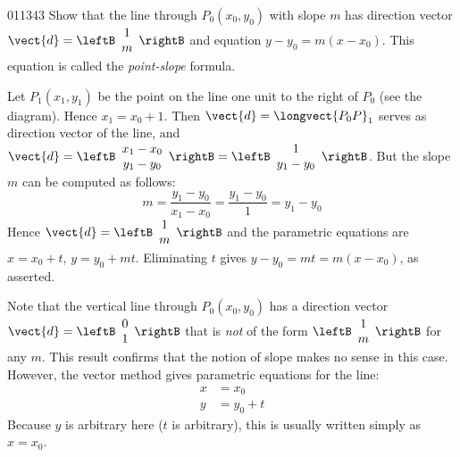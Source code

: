 \begin{example}{}{011343}
Show that the line through $P_{0}(x_{0}, y_{0})$ with slope $m$ has direction vector 
$\vect{d} = \leftB
\begin{array}{c}
1 \\
m
\end{array}
\rightB$
and equation $y - y_{0} = m(x - x_{0})$. This equation is called the \textit{point-slope} formula.



\begin{wrapfigure}[9]{l}{5cm} 
	
\end{wrapfigure}
\setlength{\rightskip}{0pt plus 200pt} 
\begin{solution}  Let $P_{1}(x_{1}, y_{1})$ be the point on the line one unit to the right of $P_{0}$ (see the diagram). Hence $x_{1} = x_{0} + 1$. Then $\vect{d} = \longvect{P_0P}_1$ serves as direction vector of the line, and 
  $\vect{d} = \leftB
  \begin{array}{c}
  x_{1} - x_{0} \\
  y_{1} - y_{0}
  \end{array}
  \rightB
  = \leftB
  \begin{array}{c}
  1 \\
  y_{1} - y_{0}
  \end{array}
  \rightB$. But the slope $m$ can be computed as follows:
\begin{equation*}
m = \frac{y_{1} - y_{0}}{x_{1} - x_{0}} = \frac{y_{1} - y_{0}}{1} = y_{1} - y_{0}
\end{equation*}
Hence 
$\vect{d} = \leftB
\begin{array}{c}
1 \\
m
\end{array}
\rightB$ 
and the parametric equations are $x = x_{0} + t$, $y = y_{0} + mt$. Eliminating $t$ gives $y - y_{0} = mt = m(x - x_{0})$, as asserted.

\end{solution}
\end{example}

Note that the vertical line through $P_{0}(x_{0}, y_{0})$ has a direction vector 
$\vect{d} = \leftB
\begin{array}{c}
0 \\
1
\end{array}
\rightB$ 
that is \textit{not} of the form 
$\leftB
\begin{array}{c}
1 \\
m
\end{array}
\rightB$ 
for any $m$.
 This result confirms that the notion of slope makes no sense in this 
case. However, the vector method gives parametric equations for the 
line:
\begin{align*}
x &= x_{0} \\
y &= y_{0} + t
\end{align*}
Because $y$ is arbitrary here ($t$ is arbitrary), this is usually written simply as $x = x_{0}$.


